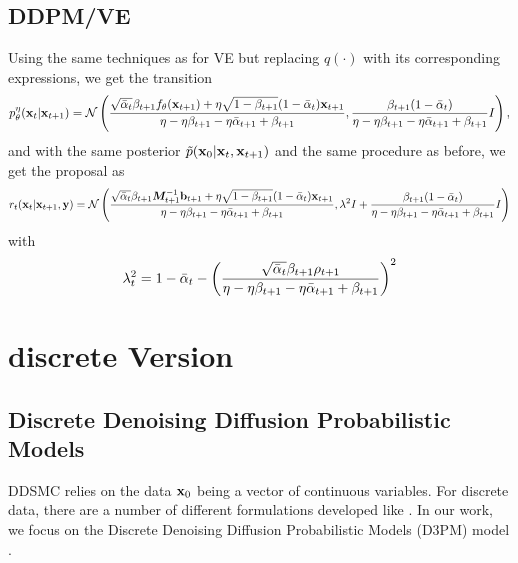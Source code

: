 \subsection{DDPM/VE}
Using the same techniques as for VE but replacing $q(\cdot)$ with its corresponding expressions, we get the transition 
\begin{align}
    p_\theta^\eta(\mathbf{x}_{t}|\mathbf{x}_{t+1}) = \mathcal{N}\left(
    \frac{\sqrt{\bar\alpha_t}\beta_{t+1}f_\theta(\mathbf{x}_{t+1})
    +
    \eta\sqrt{1-\beta_{t+1}}(1-\bar\alpha_t)\mathbf{x}_{t+1}}{\eta-\eta\beta_{t+1} - \eta\bar\alpha_{t+1} + \beta_{t+1}},
    \frac{\beta_{t+1}(1-\bar\alpha_t)}{\eta-\eta\beta_{t+1} - \eta\bar\alpha_{t+1} + \beta_{t+1}}I
    \right),
\end{align}
and with the same posterior $\tilde p(\mathbf{x}_0|\mathbf{x}_{t}, \mathbf{x}_{t+1})$ and the same procedure as before, we get the proposal as
\begin{align}
    r_t(\mathbf{x}_{t}|\mathbf{x}_{t+1}, \mathbf{y}) = \mathcal{N}\left( \frac{\sqrt{\bar\alpha_t}\beta_{t+1}{\bm{M}}_{t+1}^{-1}{\mathbf{b}}_{t+1}
    +
    \eta\sqrt{1-\beta_{t+1}}(1-\bar\alpha_t)\mathbf{x}_{t+1}}{\eta-\eta\beta_{t+1} - \eta\bar\alpha_{t+1} + \beta_{t+1}},
    \lambda^2I +
    \frac{\beta_{t+1}(1-\bar\alpha_t)}{\eta-\eta\beta_{t+1} - \eta\bar\alpha_{t+1} + \beta_{t+1}}I
    \right)
\end{align}
with 
\begin{align}
    \lambda_t^2 = 1-\bar\alpha_t - \left(\frac{\sqrt{\bar\alpha_t}\beta_{t+1}\rho_{t+1}}{\eta-\eta\beta_{t+1} - \eta\bar\alpha_{t+1} + \beta_{t+1}}\right)^2
\end{align}

\section{discrete Version}
\label{app:d3smc}
\subsection{Discrete Denoising Diffusion Probabilistic Models}
DDSMC relies on the data $\mathbf{x}_0$ being a vector of continuous variables. For discrete data, there are a number of different formulations developed like \cite{austin_structured_2021, campbell_continuous_2022-1, dieleman_continuous_2022, sun_score-based_2023}. In our work, we focus on the Discrete Denoising Diffusion Probabilistic Models (D3PM) model \citep{austin_structured_2021}. 

